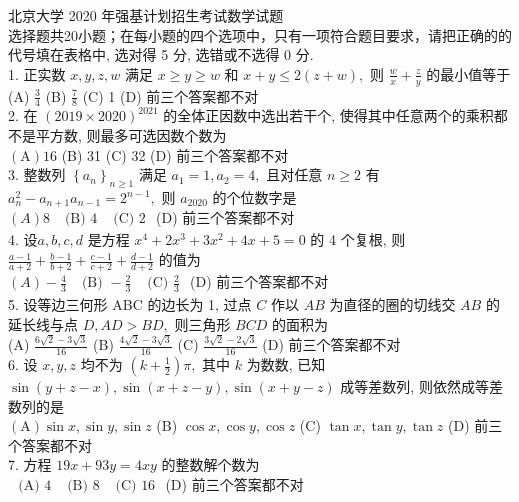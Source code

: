 北京大学 2020 年强基计划招生考试数学试题\\
选择题共20小题；在每小题的四个选项中，只有一项符合题目要求，请把正确的的代号填在表格中, 选对得 5 分, 选错或不选得 0 分.\\
1. 正实数 $x, y, z, w$ 满足 $x \geq y \geq w$ 和 $x+y \leq 2(z+w),$ 则 $\frac{w}{x}+\frac{z}{y}$ 的最小值等于\\
(A) $\frac{3}{4}$
(B) $\frac{7}{8}$
(C) 1
(D) 前三个答案都不对\\
2. 在 $(2019 \times 2020)^{2021}$ 的全体正因数中选出若干个, 使得其中任意两个的乘积都不是平方数, 则最多可选因数个数为\\
$(\mathrm{A}) 16$
(B) 31
(C) 32
(D) 前三个答案都不对\\
3. 整数列 $\left\{a_{n}\right\}_{n \geq 1}$ 满足 $a_{1}=1, a_{2}=4,$ 且对任意 $n \geq 2$ 有 $a_{n}^{2}-a_{n+1} a_{n-1}=2^{n-1},$ 则 $a_{2020}$ 的个位数字是\\
$(A) 8$
$\begin{array}{ll}\text { (B) } 4 & \text { (C) } 2\end{array}$
(D) 前三个答案都不对\\
4. 设$a, b, c, d$ 是方程 $x^{4}+2 x^{3}+3 x^{2}+4 x+5=0$ 的 4 个复根, 则 $\frac{a-1}{a+2}+\frac{b-1}{b+2}+\frac{c-1}{c+2}+\frac{d-1}{d+2}$
的值为\\
$(A)-\frac{4}{3}$
$\begin{array}{ll}\text { (B) }-\frac{2}{3} & \text { (C) } \frac{2}{3}\end{array}$
(D) 前三个答案都不对\\
5. 设等边三何形 ABC 的边长为 1, 过点 $C$ 作以 $A B$ 为直径的圈的切线交 $A B$ 的延长线与点 $D, A D>B D,$ 则三角形 $B C D$ 的面积为\\
(A) $\frac{6 \sqrt{2}-3 \sqrt{3}}{16}$
(B) $\frac{4 \sqrt{2}-3 \sqrt{3}}{16}$
(C) $\frac{3 \sqrt{2}-2 \sqrt{3}}{16}$
(D) 前三个答案都不对\\
6. 设 $x, y, z$ 均不为 $\left(k+\frac{1}{2}\right) \pi,$ 其中 $k$ 为数数, 已知$\sin (y+z-x), \sin (x+z-y), \sin (x+
y-z )$ 成等差数列, 则依然成等差数列的是\\
$(\mathrm{A}) \sin x, \sin y, \sin z$
(B) $\cos x, \cos y, \cos z$
(C) $\tan x, \tan y, \tan z$
(D) 前三个答案都不对\\
7. 方程 $19 x+93 y=4 x y$ 的整数解个数为\\
$\begin{array}{lll}\text { (A) } 4 & \text { (B) } 8 & \text { (C) } 16\end{array}$
(D) 前三个答案都不对\\
